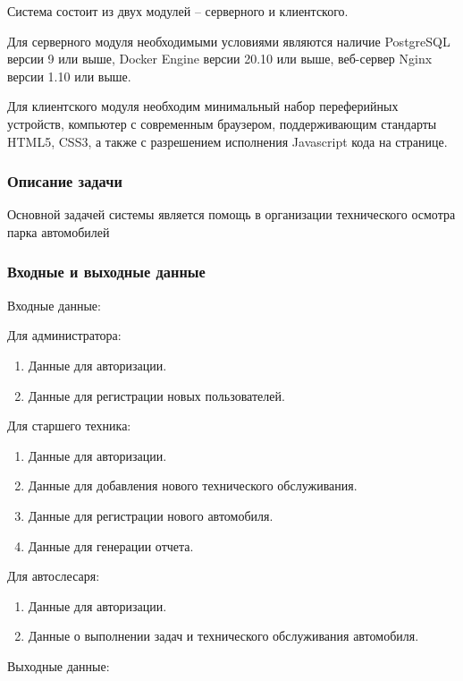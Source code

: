 \documentclass[../nirs.tex]{subfiles}
\begin{document}
    Система состоит из двух модулей -- серверного и клиентского.

    Для серверного модуля необходимыми условиями являются наличие PostgreSQL
    версии 9 или выше, Docker Engine версии 20.10 или выше, веб-сервер Nginx
    версии 1.10 или выше.

    Для клиентского модуля необходим минимальный набор переферийных устройств,
    компьютер с современным браузером,
    поддерживающим стандарты HTML5, CSS3, а также с разрешением исполнения
    Javascript кода на странице.

    \subsubsection*{Описание задачи}

    Основной задачей системы является помощь в организации
    технического осмотра парка автомобилей

    \subsubsection*{Входные и выходные данные}
    Входные данные:

    Для администратора:
    \begin{enumerate}
        \item Данные для авторизации.
        \item Данные для регистрации новых пользователей.
    \end{enumerate}

    Для старшего техника:
    \begin{enumerate}
        \item Данные для авторизации.
        \item Данные для добавления нового технического обслуживания.
        \item Данные для регистрации нового автомобиля.
        \item Данные для генерации отчета.
    \end{enumerate}

    Для автослесаря:
    \begin{enumerate}
        \item Данные для авторизации.
        \item Данные о выполнении задач и технического обслуживания автомобиля.
    \end{enumerate}

    Выходные данные:
\end{document}
